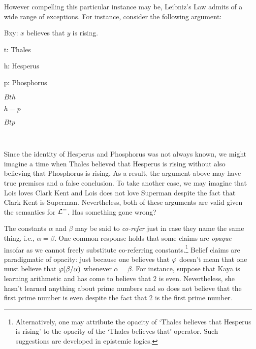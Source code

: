 However compelling this particular instance may be, Leibniz's Law admits of a wide range of exceptions.
For instance, consider the following argument:

\begin{multicols}{2}
  
\begin{ekey}
    \item[Bxy:] $x$ believes that $y$ is rising.
    \item[t:] Thales
    \item[h:] Hesperus
    \item[p:] Phosphorus
\end{ekey}

\begin{earg}
  \item[] $Bth$
  \item[] $h=p$
  \item[\therefore] $Btp$
  \item[] ~
\end{earg}

\end{multicols}

Since the identity of Hesperus and Phosphorus was not always known, we might imagine a time when Thales believed that Hesperus is rising without also believing that Phosphorus is rising.
As a result, the argument above may have true premises and a false conclusion.
To take another case, we may imagine that Lois loves Clark Kent and Lois does not love Superman despite the fact that Clark Kent is Superman.
Nevertheless, both of these arguments are valid given the semantics for $\mathcal{L}^{=}$.
Has something gone wrong?

The constants $\alpha$ and $\beta$ may be said to \textit{co-refer} just in case they name the same thing, i.e., $\alpha=\beta$.
One common response holds that some claims are \textit{opaque} insofar as we cannot freely substitute co-referring constants.\footnote{Alternatively, one may attribute the opacity of `Thales believes that Hesperus is rising' to the opacity of the `Thales believes that' operator. Such suggestions are developed in epistemic logics.}
Belief claims are paradigmatic of opacity: just because one believes that $\varphi$ doesn't mean that one must believe that $\varphi(\beta/\alpha)$ whenever $\alpha=\beta$.
For instance, suppose that Kaya is learning arithmetic and has come to believe that $2$ is even.
Nevertheless, she hasn't learned anything about prime numbers and so does not believe that the first prime number is even despite the fact that $2$ is the first prime number. 

